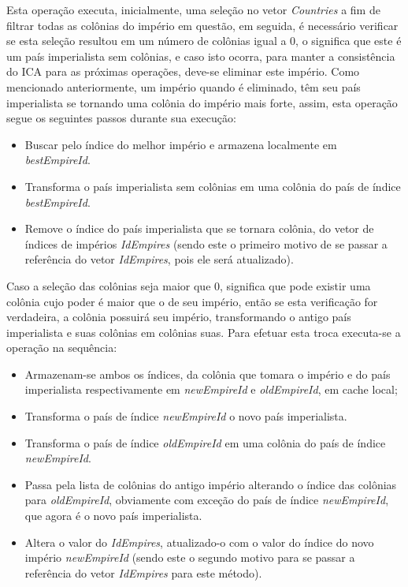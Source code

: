 Esta operação executa, inicialmente, uma seleção no vetor \emph{Countries} a fim de filtrar todas as colônias do império em questão, em seguida, é necessário verificar se esta seleção resultou em um número de colônias igual a 0, o significa que este é um país imperialista sem colônias, e caso isto ocorra, para manter a consistência do ICA para as próximas operações, deve-se eliminar este império. Como mencionado anteriormente, um império quando é eliminado, têm seu país imperialista se tornando uma colônia do império mais forte, assim, esta operação segue os seguintes passos durante sua execução:
\begin{itemize}
\item Buscar pelo índice do melhor império e armazena localmente em \emph{bestEmpireId}.
\item Transforma o país imperialista sem colônias em uma colônia do país de índice \emph{bestEmpireId}.
\item Remove o índice do país imperialista que se tornara colônia, do vetor de índices de impérios \emph{IdEmpires} (sendo este o primeiro motivo de se passar a referência do vetor \emph{IdEmpires}, pois ele será atualizado). 
\end{itemize}

Caso a seleção das colônias seja maior que 0, significa que pode existir uma colônia cujo poder é maior que o de seu império, então se esta verificação for verdadeira, a colônia possuirá seu império, transformando o antigo país imperialista e suas colônias em colônias suas. Para efetuar esta troca executa-se a operação na sequência:

\begin{itemize}
\item Armazenam-se ambos os índices, da colônia que tomara o império e do país imperialista respectivamente em \emph{newEmpireId} e \emph{oldEmpireId},  em cache local;
\item Transforma o país de índice \emph{newEmpireId} o novo país imperialista.
\item Transforma o país de índice \emph{oldEmpireId} em uma colônia do país de índice \emph{newEmpireId}.
\item Passa pela lista de colônias do antigo império alterando o índice das colônias para \emph{oldEmpireId}, obviamente com exceção do país de índice \emph{newEmpireId}, que agora é o novo país imperialista.   
\item Altera o valor do \emph{IdEmpires}, atualizado-o com o valor do índice do novo império \emph{newEmpireId} (sendo este o segundo motivo para se passar a referência do vetor \emph{IdEmpires} para este método).
\end{itemize}

